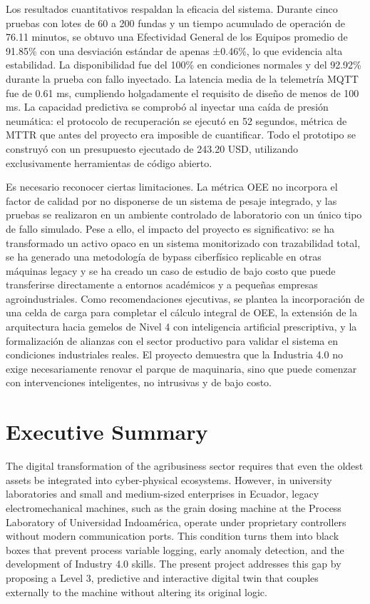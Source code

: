 Los resultados cuantitativos respaldan la eficacia del sistema. Durante cinco pruebas con lotes de 60 a 200 fundas y un tiempo acumulado de operación de 76.11 minutos, se obtuvo una Efectividad General de los Equipos promedio de 91.85\% con una desviación estándar de apenas ±0.46\%, lo que evidencia alta estabilidad. La disponibilidad fue del 100\% en condiciones normales y del 92.92\% durante la prueba con fallo inyectado. La latencia media de la telemetría MQTT fue de 0.61 ms, cumpliendo holgadamente el requisito de diseño de menos de 100 ms. La capacidad predictiva se comprobó al inyectar una caída de presión neumática: el protocolo de recuperación se ejecutó en 52 segundos, métrica de MTTR que antes del proyecto era imposible de cuantificar. Todo el prototipo se construyó con un presupuesto ejecutado de 243.20 USD, utilizando exclusivamente herramientas de código abierto.

Es necesario reconocer ciertas limitaciones. La métrica OEE no incorpora el factor de calidad por no disponerse de un sistema de pesaje integrado, y las pruebas se realizaron en un ambiente controlado de laboratorio con un único tipo de fallo simulado. Pese a ello, el impacto del proyecto es significativo: se ha transformado un activo opaco en un sistema monitorizado con trazabilidad total, se ha generado una metodología de bypass ciberfísico replicable en otras máquinas legacy y se ha creado un caso de estudio de bajo costo que puede transferirse directamente a entornos académicos y a pequeñas empresas agroindustriales. Como recomendaciones ejecutivas, se plantea la incorporación de una celda de carga para completar el cálculo integral de OEE, la extensión de la arquitectura hacia gemelos de Nivel 4 con inteligencia artificial prescriptiva, y la formalización de alianzas con el sector productivo para validar el sistema en condiciones industriales reales. El proyecto demuestra que la Industria 4.0 no exige necesariamente renovar el parque de maquinaria, sino que puede comenzar con intervenciones inteligentes, no intrusivas y de bajo costo.

\chapter*{Executive Summary}

The digital transformation of the agribusiness sector requires that even the oldest assets be integrated into cyber-physical ecosystems. However, in university laboratories and small and medium-sized enterprises in Ecuador, legacy electromechanical machines, such as the grain dosing machine at the Process Laboratory of Universidad Indoamérica, operate under proprietary controllers without modern communication ports. This condition turns them into black boxes that prevent process variable logging, early anomaly detection, and the development of Industry 4.0 skills. The present project addresses this gap by proposing a Level 3, predictive and interactive digital twin that couples externally to the machine without altering its original logic.

